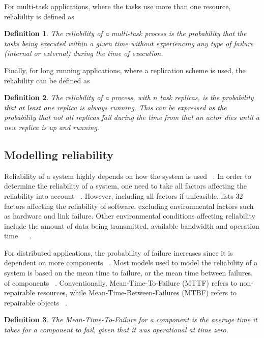 \documentclass{cslthse-msc}
\newtheorem{definition}{Definition}[chapter]
\begin{document}
For multi-task applications, where the tasks use more than one resource, reliability is defined as
\begin{definition} \label{def:multi_task_reliability}
The reliability of a multi-task process is the probability that the tasks being executed within a given time without experiencing any type of failure (internal or external) during the time of execution.
\end{definition}

Finally, for long running applications, where a replication scheme is used, the reliability can be defined as \cite{effTaskReplMobGrid}
\begin{definition} \label{def:task_replica_reliability}
The reliability of a process, with $n$ task replicas, is the probability that at least one replica is always running. This can be expressed as the probability that not all replicas fail during the time from that an actor dies until a new replica is up and running.
\end{definition}

\subsection{Modelling reliability} \label{subsec:background_modelling_rel}
Reliability of a system highly depends on how the system is used ~\cite{surveyRelPrediction}. In order to determine the reliability of a system, one need to take all factors affecting the reliability into account ~\cite{surveyReliabilityDistr}. However, including all factors if unfeasible. \cite{factorsAffectingRel} lists 32 factors affecting the reliability of software, excluding environmental factors such as hardware and link failure. Other environmental conditions affecting reliability include the amount of data being transmitted, available bandwidth and operation time ~\cite{cloudServiceRel} ~\cite{hierarchicalRelModeling}.

For distributed applications, the probability of failure increases since it is dependent on more components ~\cite{relModelDistSimSystem}. Most models used to model the reliability of a system is based on the mean time to failure, or the mean time between failures, of components ~\cite{relModelAnalysis}. Conventionally, Mean-Time-To-Failure (MTTF) refers to non-repairable resources, while Mean-Time-Between-Failures (MTBF) refers to repairable objects ~\cite{effTaskReplMobGrid}.

\begin{definition} \label{def:mttf}
The Mean-Time-To-Failure for a component is the average time it takes for a component to fail, given that it was operational at time zero.
\end{definition}
\end{document}
